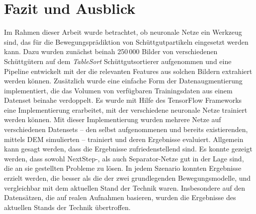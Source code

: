 \chapter{Fazit und Ausblick}
\label{cap:fazit}

Im Rahmen dieser Arbeit wurde betrachtet, ob neuronale Netze ein Werkzeug sind, das für die Bewegungsprädiktion von Schüttgutpartikeln eingesetzt werden kann.
Dazu wurden zunächst beinah 250\,000 Bilder von verschiedenen Schüttgütern auf dem \textit{TableSort} Schüttgutsortierer aufgenommen 
und eine Pipeline entwickelt mit der die relevanten Features aus solchen Bildern extrahiert werden können.
Zusätzlich wurde eine einfache Form der Datenaugmentierung implementiert, die das Volumen von verfügbaren Trainingsdaten aus einem Datenset beinahe verdoppelt.
Es wurde mit Hilfe des TensorFlow Frameworks eine Implementierung erarbeitet, mit der verschiedene neuronale Netze trainiert werden können.
Mit dieser Implementierung wurden mehrere Netze auf verschiedenen Datensets -- den selbst aufgenommenen und bereits existierenden, mittels DEM simulierten -- trainiert und deren Ergebnisse evaluiert.
Allgemein kann gesagt werden, dass die Ergebnisse zufriedenstellend sind.
Es konnte gezeigt werden, dass sowohl NextStep-, als auch Separator-Netze gut in der Lage sind, die an sie gestellten Probleme zu lösen.
In jedem Szenario konnten Ergebnisse erzielt werden, die besser als die der zwei grundlegenden Bewegungsmodelle, 
und vergleichbar mit dem aktuellen Stand der Technik waren.
Insbesondere auf den Datensätzen, die auf realen Aufnahmen basieren, wurden die Ergebnisse des aktuellen Stands der Technik übertroffen.






